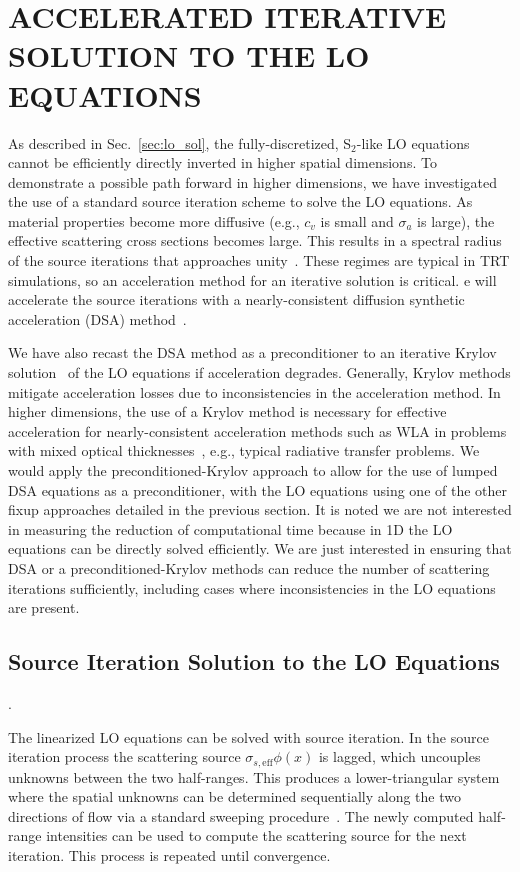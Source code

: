 
\chapter{\uppercase {Accelerated Iterative Solution to the LO Equations}}

As described in Sec.~\ref{sec:lo_sol}, the fully-discretized, S$_2$-like LO equations
cannot be efficiently directly inverted in higher spatial dimensions.  
To demonstrate a possible path forward in
higher dimensions, we have investigated the use of a standard
source iteration scheme to solve the LO equations.  As
material properties become more diffusive (e.g., $c_v$ is small and $\sigma_a$ is
large), the effective scattering cross sections becomes large.  This results in a spectral radius of the source iterations that approaches
unity~\cite{morel_ldtrt}.  These regimes are typical in TRT simulations, so an
acceleration method for an iterative solution is critical. 
e will accelerate the source iterations with a nearly-consistent diffusion synthetic acceleration
(DSA) method~\cite{wla,wla_thesis}.

We have also recast the DSA method as a preconditioner to an iterative
Krylov solution~\cite{larson_morel_sn} of the LO equations if acceleration degrades.  Generally, Krylov
methods mitigate acceleration losses due to inconsistencies in the acceleration
method.  In higher dimensions, the use of a Krylov method is necessary for effective
acceleration for nearly-consistent acceleration methods such as WLA in problems with
mixed optical thicknesses~\cite{larson_morel_sn}, e.g., typical radiative transfer
problems.
  We would apply the preconditioned-Krylov approach to allow for the use of lumped DSA
  equations as a preconditioner, with the LO equations using one of the other fixup
approaches detailed
in the previous section.  It is noted we are not interested in measuring the reduction of
computational time because in 1D the LO equations can be directly solved efficiently.
We are just interested in ensuring that DSA or a preconditioned-Krylov methods can reduce the
number of scattering iterations sufficiently, including cases where inconsistencies
in the LO equations are present.  %


\section{Source Iteration Solution to the LO Equations}.

The linearized LO equations can be solved with source iteration.  In the source iteration
process the scattering source $\sigma_{s,\text{eff}}\phi(x)$ is lagged, which
uncouples unknowns between the two half-ranges.  This produces a lower-triangular
system where the spatial unknowns can be determined sequentially along the two directions of flow via a
standard sweeping procedure~\cite{lewis,morel_ldtrt}.  The newly computed half-range
intensities can be used to compute the scattering source for the next iteration.  This
process is repeated until convergence.  

